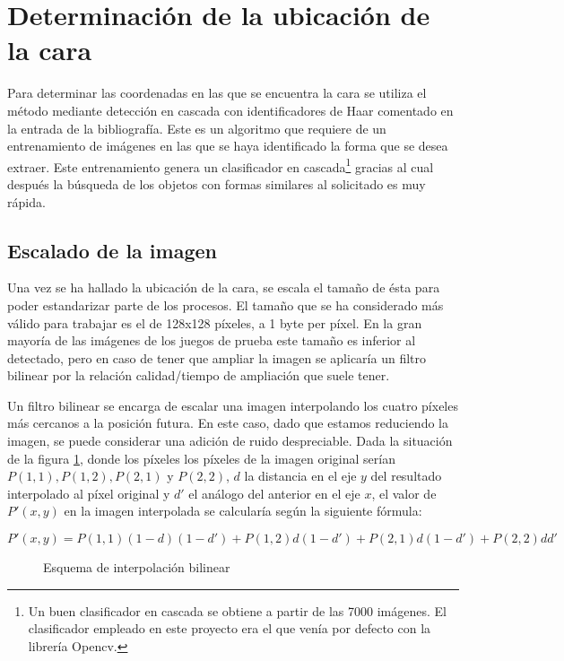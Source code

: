 \section{Determinación de la ubicación de la cara}
Para determinar las coordenadas en las que se encuentra la cara se utiliza el método mediante detección en cascada con identificadores de Haar comentado en la entrada \cite{ViolaJones} de la bibliografía. Este es un algoritmo que requiere de un entrenamiento de imágenes en las que se haya identificado la forma que se desea extraer. Este entrenamiento genera un clasificador en cascada\footnote{Un buen clasificador en cascada se obtiene a partir de las 7000 imágenes. El clasificador empleado en este proyecto era el que venía por defecto con la librería Opencv.} gracias al cual después la búsqueda de los objetos con formas similares al solicitado es muy rápida. 



\subsection{Escalado de la imagen}
Una vez se ha hallado la ubicación de la cara, se escala el tamaño de ésta para poder estandarizar parte de los procesos. El tamaño que se ha considerado más válido para trabajar es el de 128x128 píxeles, a 1 byte per píxel. En la gran mayoría de las imágenes de los juegos de prueba este tamaño es inferior al detectado, pero en caso de tener que ampliar la imagen se aplicaría un filtro bilinear por la relación calidad/tiempo de ampliación que suele tener.

Un filtro bilinear se encarga de escalar una imagen interpolando los cuatro píxeles más cercanos a la posición futura. En este caso, dado que estamos reduciendo la imagen, se puede considerar una adición de ruido despreciable. Dada la situación de la figura \ref{fig:interp_bilinear}, donde los píxeles los píxeles de la imagen original serían $P(1,1), P(1,2), P(2,1)$ y $P(2,2)$, $d$ la distancia en el eje $y$ del resultado interpolado al píxel original y $d'$ el análogo del anterior en el eje $x$, el valor de $P'(x,y)$ en la imagen interpolada se calcularía según la siguiente fórmula:

\[ P'(x,y) = P(1,1) (1-d) (1-d')+ P(1,2) d (1-d') + P(2,1) d (1-d') + P(2,2) d d'
\]

\begin{figure}[h!]
        \centering
        
        \caption{Esquema de interpolación bilinear}
	\label{fig:interp_bilinear}
\end{figure}


